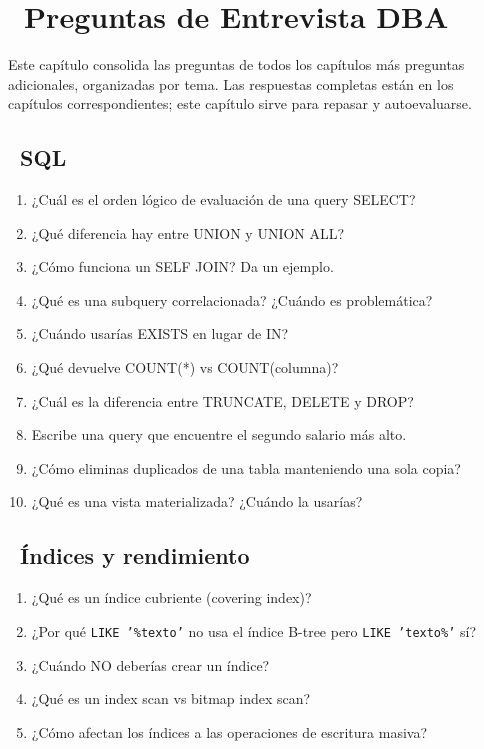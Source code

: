 \chapter[Preguntas de Entrevista DBA]{~Preguntas de Entrevista DBA}

Este capítulo consolida las preguntas de todos los capítulos más preguntas adicionales, organizadas por tema.
Las respuestas completas están en los capítulos correspondientes; este capítulo sirve para repasar y autoevaluarse.

\section[\emj{🎤} SQL]{~SQL}

\begin{entrevistabox}
\begin{enumerate}
  \item ¿Cuál es el orden lógico de evaluación de una query SELECT?
  \item ¿Qué diferencia hay entre UNION y UNION ALL?
  \item ¿Cómo funciona un SELF JOIN? Da un ejemplo.
  \item ¿Qué es una subquery correlacionada? ¿Cuándo es problemática?
  \item ¿Cuándo usarías EXISTS en lugar de IN?
  \item ¿Qué devuelve COUNT(*) vs COUNT(columna)?
  \item ¿Cuál es la diferencia entre TRUNCATE, DELETE y DROP?
  \item Escribe una query que encuentre el segundo salario más alto.
  \item ¿Cómo eliminas duplicados de una tabla manteniendo una sola copia?
  \item ¿Qué es una vista materializada? ¿Cuándo la usarías?
\end{enumerate}
\end{entrevistabox}

\section[\emj{🎤} Índices y rendimiento]{~Índices y rendimiento}

\begin{entrevistabox}
\begin{enumerate}
  \item ¿Qué es un índice cubriente (covering index)?
  \item ¿Por qué \texttt{LIKE '\%texto'} no usa el índice B-tree pero \texttt{LIKE 'texto\%'} sí?
  \item ¿Cuándo NO deberías crear un índice?
  \item ¿Qué es un index scan vs bitmap index scan?
  \item ¿Cómo afectan los índices a las operaciones de escritura masiva?
\end{enumerate}
\end{entrevistabox}

